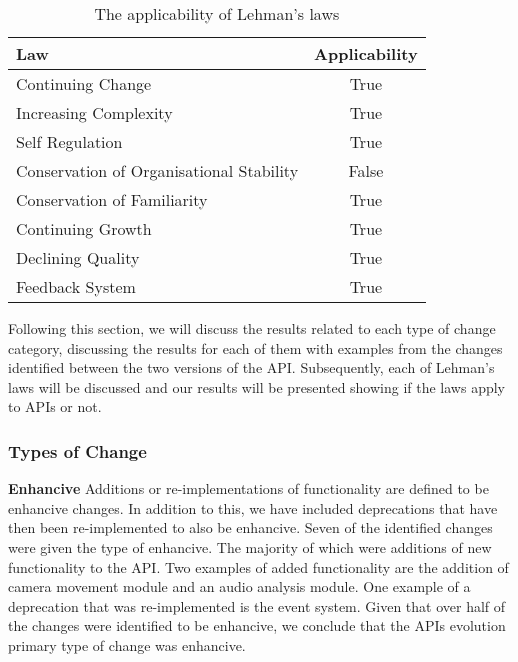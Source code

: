 \documentclass{sig-alternate}
\begin{document}
\begin{table}
       \centering
       \begin{tabular}[ht]{l|c}
              \toprule

              \textbf{Law}                              & \textbf{Applicability}    \\ \midrule
              Continuing Change                         & True                      \\ \hline
              Increasing Complexity                     & True                     \\ \hline
              Self Regulation                           & True                      \\ \hline
              Conservation of Organisational Stability  & False                     \\ \hline
              Conservation of Familiarity               & True                      \\ \hline
              Continuing Growth                         & True                      \\ \hline
              Declining Quality                         & True                     \\ \hline
              Feedback System                           & True                      \\ 

              \bottomrule

       \end{tabular}
       \caption{The applicability of Lehman's laws}
       \label{table:lehman}
\end{table}

Following this section, we will discuss the results related to each type of change category, discussing the results for each of them with examples from the changes identified between the two versions of the API. Subsequently, each of Lehman's laws will be discussed and our results will be presented showing if the laws apply to APIs or not.





\subsubsection{Types of Change}

\smallskip \noindent
\textbf{Enhancive  }
Additions or re-implementations of functionality are defined to be enhancive changes. In addition to this, we have included deprecations that have then been re-implemented to also be enhancive.
Seven of the identified changes were given the type of enhancive. The majority of which were additions of new functionality to the API. Two examples of added functionality are the addition of camera movement module and an audio analysis module. One example of a deprecation that was re-implemented is the event system.
Given that over half of the changes were identified to be enhancive, we conclude that the APIs evolution primary type of change was enhancive. 
\end{document}
